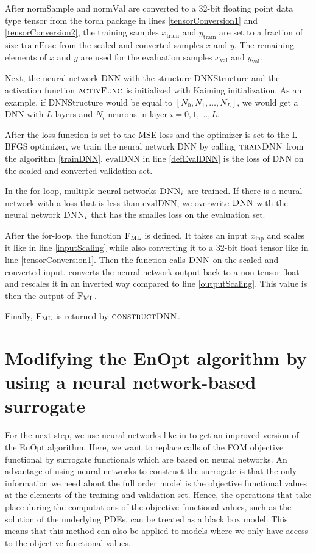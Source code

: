 After $\mathrm{normSample}$ and $\mathrm{normVal}$ are converted to a 32-bit floating point data type tensor from the torch package in lines \ref{tensorConversion1} and \ref{tensorConversion2}, the training samples $x_\mathrm{train}$ and $y_\mathrm{train}$ are set to a fraction of size $\mathrm{trainFrac}$ from the scaled and converted samples $x$ and $y$. The remaining elements of $x$ and $y$ are used for the evaluation samples $x_\mathrm{val}$ and $y_\mathrm{val}$.

Next, the neural network $\mathrm{DNN}$ with the structure $\mathrm{DNNStructure}$ and the activation function $\textproc{activFunc}$ is initialized with Kaiming initialization. As an example, if $\mathrm{DNNStructure}$ would be equal to $[N_0, N_1, \dotsc, N_L]$, we would get a DNN with $L$ layers and $N_i$ neurons in layer $i=0, 1, \dotsc, L$.

After the loss function is set to the MSE loss and the optimizer is set to the L-BFGS optimizer, we train the neural network $\mathrm{DNN}$ by calling $\textproc{trainDNN}$ from the algorithm \ref{trainDNN}. $\mathrm{evalDNN}$ in line \ref{defEvalDNN} is the loss of $\mathrm{DNN}$ on the scaled and converted validation set.

In the for-loop, multiple neural networks $\textproc{DNN}_i$ are trained. If there is a neural network with a loss that is less than $\mathrm{evalDNN}$, we overwrite $\textproc{DNN}$ with the neural network $\textproc{DNN}_i$ that has the smalles loss on the evaluation set.

After the for-loop, the function $\textproc{F$_\mathrm{ML}$}$ is defined. It takes an input $x_\mathrm{inp}$ and scales it like in line \ref{inputScaling} while also converting it to a 32-bit float tensor like in line \ref{tensorConversion1}. Then the function calls $\textproc{DNN}$ on the scaled and converted input, converts the neural network output back to a non-tensor float and rescales it in an inverted way compared to line \ref{outputScaling}. This value is then the output of $\textproc{F$_\mathrm{ML}$}$.

Finally, $\textproc{F$_\mathrm{ML}$}$ is returned by $\textproc{constructDNN}$.

\section{Modifying the EnOpt algorithm by using a neural network-based surrogate}

For the next step, we use neural networks like in \cite{Keil2022-dj} to get an improved version of the EnOpt algorithm. Here, we want to replace calls of the FOM objective functional by surrogate functionals which are based on neural networks. An advantage of using neural networks to construct the surrogate is that the only information we need about the full order model is the objective functional values at the elements of the training and validation set. Hence, the operations that take place during the computations of the objective functional values, such as the solution of the underlying PDEs, can be treated as a black box model. This means that this method can also be applied to models where we only have access to the objective functional values.\\

